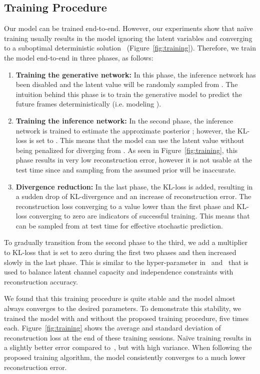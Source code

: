 \documentclass{article} \usepackage{iclr2018_conference,times}
\begin{document}
%
 \subsection{Training Procedure}
Our model can be trained end-to-end. However, our experiments show that na\"ive training usually results in the model ignoring the latent variables and converging to a suboptimal deterministic solution~ (Figure~\ref{fig:training}). Therefore, we train the model end-to-end in three phases, as follows:

\begin{enumerate}[leftmargin=*]\item \textbf{Training the generative network:} In this phase, the inference network has been disabled and the latent value  will be randomly sampled from . The intuition behind this phase is to train the generative model to predict the future frames deterministically (i.e. modeling ). 

\item \textbf{Training the inference network:} In the second phase, the inference network is trained to estimate the approximate posterior ; however, the KL-loss is set to . This means that the model can use the latent value without being penalized for diverging from . As seen in Figure~\ref{fig:training}, this phase results in very low reconstruction error, however it is not usable at the test time since  and sampling  from the assumed prior will be inaccurate.


\item \textbf{Divergence reduction:} In the last phase, the KL-loss is added, resulting in a sudden drop of KL-divergence and an increase of reconstruction error. The reconstruction loss converging to a value lower than the first phase and KL-loss converging to zero are indicators of successful training. This means that  can be sampled from  at test time for effective stochastic prediction. 
\end{enumerate}



To gradually transition from the second phase to the third, we add a multiplier to KL-loss that is set to zero during the first two phases and then  increased slowly in the last phase. This is similar to the  hyper-parameter in~\cite{higgins2016beta} and~\cite{DBLP:conf/conll/BowmanVVDJB16} that is used to balance latent channel capacity and independence constraints with reconstruction accuracy. 

We found that this training procedure is quite stable and the model almost always converges to the desired parameters. To demonstrate this stability, we trained the model with and without the proposed training procedure, five times each. Figure~\ref{fig:training} shows the average and standard deviation of reconstruction loss at the end of these training sessions. Na\"ive training results in a slightly better error compared to~\cite{finn2016unsupervised}, but with high variance. When following the proposed training algorithm, the model consistently converges to a much lower reconstruction error.
\end{document}
